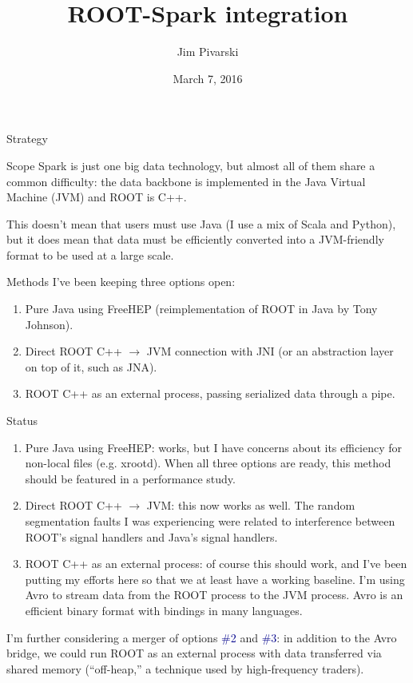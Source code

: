 \documentclass{beamer}
\title[2016-03-07-spark]{ROOT-Spark integration}
\author{Jim Pivarski}
\institute{Princeton Univeristy --- DIANA}
\date{March 7, 2016}
\begin{document}
\begin{frame}
  \titlepage
\end{frame}


\begin{frame}{Strategy}
\begin{block}{Scope}
Spark is just one big data technology, but almost all of them share a common difficulty: the data backbone is implemented in the Java Virtual Machine (JVM) and ROOT is C++.

\vspace{0.2 cm}
This doesn't mean that users must use Java (I use a mix of Scala and Python), but it does mean that data must be efficiently converted into a JVM-friendly format to be used at a large scale.
\end{block}

\begin{block}{Methods}
I've been keeping three options open:
\begin{enumerate}
\item Pure Java using FreeHEP (reimplementation of ROOT in Java by Tony Johnson).
\item Direct ROOT C++ $\to$ JVM connection with JNI (or an abstraction layer on top of it, such as JNA).
\item ROOT C++ as an external process, passing serialized data through a pipe.
\end{enumerate}
\end{block}
\end{frame}

\begin{frame}{Status}
\begin{enumerate}
\item Pure Java using FreeHEP: works, but I have concerns about its efficiency for non-local files (e.g. xrootd). When all three options are ready, this method should be featured in a performance study.

\item Direct ROOT C++ $\to$ JVM: this now works as well. The random segmentation faults I was experiencing were related to interference between ROOT's signal handlers and Java's signal handlers.

\item ROOT C++ as an external process: of course this should work, and I've been putting my efforts here so that we at least have a working baseline. I'm using Avro to stream data from the ROOT process to the JVM process. Avro is an efficient binary format with bindings in many languages.
\end{enumerate}

I'm further considering a merger of options \textcolor{darkblue}{\#2} and \textcolor{darkblue}{\#3}: in addition to the Avro bridge, we could run ROOT as an external process with data transferred via shared memory (``off-heap,'' a technique used by high-frequency traders).
\end{frame}
\end{document}
